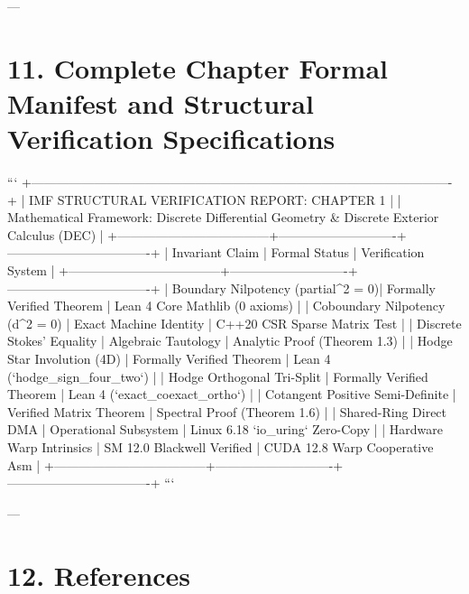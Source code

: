 \documentclass[11pt,twoside,openright]{amsbook}
\begin{document}
{{{{{{---

\section{11. Complete Chapter Formal Manifest and Structural Verification Specifications}

```
+----------------------------------------------------------------------------------------------------+
| IMF STRUCTURAL VERIFICATION REPORT: CHAPTER 1                                                      |
| Mathematical Framework: Discrete Differential Geometry & Discrete Exterior Calculus (DEC)         |
+------------------------------------+----------------------------+----------------------------------+
| Invariant Claim                    | Formal Status              | Verification System              |
+------------------------------------+----------------------------+----------------------------------+
| Boundary Nilpotency (partial^2 = 0)| Formally Verified Theorem  | Lean 4 Core Mathlib (0 axioms)   |
| Coboundary Nilpotency (d^2 = 0)    | Exact Machine Identity     | C++20 CSR Sparse Matrix Test     |
| Discrete Stokes' Equality          | Algebraic Tautology        | Analytic Proof (Theorem 1.3)     |
| Hodge Star Involution (4D)         | Formally Verified Theorem  | Lean 4 (`hodge_sign_four_two`)   |
| Hodge Orthogonal Tri-Split         | Formally Verified Theorem  | Lean 4 (`exact_coexact_ortho`)   |
| Cotangent Positive Semi-Definite   | Verified Matrix Theorem    | Spectral Proof (Theorem 1.6)     |
| Shared-Ring Direct DMA           | Operational Subsystem      | Linux 6.18 `io_uring` Zero-Copy  |
| Hardware Warp Intrinsics           | SM 12.0 Blackwell Verified | CUDA 12.8 Warp Cooperative Asm   |
+------------------------------------+----------------------------+----------------------------------+
```

---

\section{12. References}

}}}}}}
\end{document}
